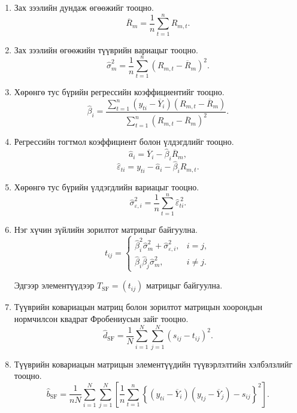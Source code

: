 \begin{enumerate}
	
	\item Зах зээлийн дундаж өгөөжийг тооцно.
	\[
	\overline{R}_m
	=
	\frac{1}{n}
	\sum_{t=1}^{n}R_{m,t}.
	\]
	
	
	
	\item Зах зээлийн өгөөжийн түүврийн
	вариацыг тооцно.
	\[
	\widehat{\sigma}_m^2
	=
	\frac{1}{n}
	\sum_{t=1}^{n}
	(R_{m,t}-\overline{R}_m)^2.
	\]
	
	\item Хөрөнгө тус бүрийн регрессийн
	коэффициентийг тооцно.
	\[
	\widehat{\beta}_i
	=
	\frac{
		\sum_{t=1}^{n}
		(y_{ti}-\overline{Y}_i)
		(R_{m,t}-\overline{R}_m)
	}{
		\sum_{t=1}^{n}
		(R_{m,t}-\overline{R}_m)^2
	}.
	\]
	
	\item Регрессийн тогтмол коэффициент
	болон үлдэгдлийг тооцно.
	\[
	\widehat a_i
	=
	\overline{Y}_i
	-
	\widehat{\beta}_i\overline{R}_m,
	\]
	\[
	\widehat{\varepsilon}_{ti}
	=
	y_{ti}
	-
	\widehat a_i
	-
	\widehat{\beta}_iR_{m,t}.
	\]
	
	\item Хөрөнгө тус бүрийн үлдэгдлийн
	вариацыг тооцно.
	\[
	\widehat{\sigma}_{\varepsilon,i}^{2}
	=
	\frac{1}{n}
	\sum_{t=1}^{n}
	\widehat{\varepsilon}_{ti}^{\,2}.
	\]
	
	\item Нэг хүчин зүйлийн зорилтот
	матрицыг байгуулна.
	\[
	t_{ij}
	=
	\begin{cases}
		\widehat{\beta}_i^2
		\widehat{\sigma}_m^2
		+
		\widehat{\sigma}_{\varepsilon,i}^{2},
		& i=j,\\[0.4em]
		\widehat{\beta}_i\widehat{\beta}_j
		\widehat{\sigma}_m^2,
		& i\neq j.
	\end{cases}
	\]
	
	Эдгээр элементүүдээр
	$T_{\mathrm{SF}}=(t_{ij})$
	матрицыг байгуулна.
	
	\item Түүврийн ковариацын матриц болон
	зорилтот матрицын хоорондын нормчилсон
	квадрат Фробениусын зайг тооцно.
	\[
	\widehat d_{\mathrm{SF}}
	=
	\frac{1}{N}
	\sum_{i=1}^{N}
	\sum_{j=1}^{N}
	(s_{ij}-t_{ij})^2.
	\]
	
	\item Түүврийн ковариацын матрицын
	элементүүдийн түүвэрлэлтийн
	хэлбэлзлийг тооцно.
	\[
	\widehat b_{\mathrm{SF}}
	=
	\frac{1}{nN}
	\sum_{i=1}^{N}
	\sum_{j=1}^{N}
	\left[
	\frac{1}{n}
	\sum_{t=1}^{n}
	\left\{
	(y_{ti}-\overline{Y}_i)
	(y_{tj}-\overline{Y}_j)
	-s_{ij}
	\right\}^{2}
	\right].
	\]
	

\end{enumerate}
